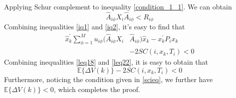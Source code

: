 \documentclass[conference]{IEEEtran}
\begin{document}
Applying Schur complement to inequality \eqref{condition_1_1}. We can obtain \\
\begin{equation} \label{iq2}
\hat{A}_{i\phi}X_{i}\hat{A}_{i\phi}<R_{i\phi}
\end{equation}
Combining inequalities \eqref{iq1} and \eqref{iq2}, it's easy to find that \\
\begin{equation} \label{leq22}
	\begin{split}
	\hat{x}^{'}_{k}\sum_{\phi=1}^{M} u_{i\phi}(\hat{A}_{i\phi}X_{i}&\hat{A}_{i\phi}) \hat{x}_{k} - x^{'}_{k}P_{i}x_{k}\\
	&-2SC(i,x_k,T_i)<0
	\end{split}
\end{equation}
Combining inequalities \eqref{leq18} and \eqref{leq22}, it is easy to obtain that
\begin{equation}
		\mathbb{E}\{\varDelta V(k)\}-2SC(i,x_k,T_i)<0
\end{equation}
Furthermore, noticing the condition given in \eqref{scieq}, we further have $\mathbb{E}\{\varDelta V(k)\} < 0$, which completes the proof.
\\
\\
\end{document}
